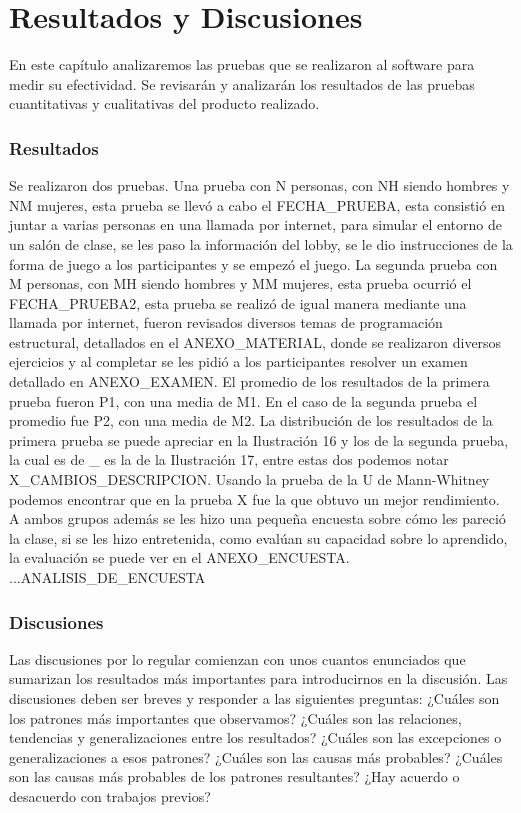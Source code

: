 \chapter{Resultados y Discusiones}
En este capítulo analizaremos las pruebas que se realizaron al software para medir su efectividad. Se revisarán y analizarán los resultados de las pruebas cuantitativas y cualitativas del producto realizado.

\subsection{Resultados}
Se realizaron dos pruebas. Una prueba con N personas, con NH siendo hombres y NM mujeres, esta prueba se llevó a cabo el FECHA_PRUEBA, esta consistió en juntar a varias personas en una llamada por internet, para simular el entorno de un salón de clase, se les paso la información del lobby, se le dio instrucciones de la forma de juego a los participantes y se empezó el juego. La segunda prueba con M personas, con MH siendo hombres y MM mujeres, esta prueba ocurrió el FECHA_PRUEBA2, esta prueba se realizó de igual manera mediante una llamada por internet, fueron revisados diversos temas de programación estructural, detallados en el ANEXO_MATERIAL, donde se realizaron diversos ejercicios y al completar se les pidió a los participantes resolver un examen detallado en ANEXO_EXAMEN.
El promedio de los resultados de la primera prueba fueron P1, con una media de M1. En el caso de la segunda prueba el promedio fue P2, con una media de M2. 
La distribución de los resultados de la primera prueba se puede apreciar en la Ilustración 16 y los de la segunda prueba, la cual es de _ es la de la Ilustración 17, entre estas dos podemos notar X_CAMBIOS_DESCRIPCION.
Usando la prueba de la U de Mann-Whitney podemos encontrar que en la prueba X fue la que obtuvo un mejor rendimiento.
A ambos grupos además se les hizo una pequeña encuesta sobre cómo les pareció la clase, si se les hizo entretenida, como evalúan su capacidad sobre lo aprendido, la evaluación se puede ver en el ANEXO_ENCUESTA. .{..ANALISIS_DE_ENCUESTA}

\subsection{Discusiones}
Las discusiones por lo regular comienzan con unos cuantos enunciados que sumarizan los resultados más importantes para introducirnos en la discusión. Las discusiones deben ser breves y responder a las siguientes preguntas:
¿Cuáles son los patrones más importantes que observamos?
¿Cuáles son las relaciones, tendencias y generalizaciones entre los resultados?
¿Cuáles son las excepciones o generalizaciones a esos patrones?
¿Cuáles son las causas más probables?
¿Cuáles son las causas más probables de los patrones resultantes?
¿Hay acuerdo o desacuerdo con trabajos previos?

